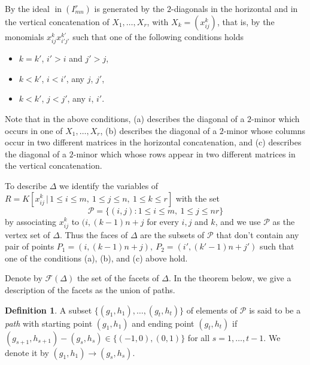 \documentclass[12pt]{amsart}
\numberwithin{equation}{section}
\theoremstyle{definition}
\newtheorem{definition}[theorem]{Definition}
\DeclareMathOperator{\ini}{in}
\begin{document}
\smallskip
By  the ideal $\ini(I_{mn}^r)$ is generated by the $2$-diagonals in the horizontal and in the vertical concatenation of $X_1,\ldots,X_r$, with $X_k=(x_{ij}^k)$, that is, by the monomials $x_{ij}^kx_{i'j'}^{k'}$ such that one of the following conditions holds
\begin{itemize}
    \item[(a)] $k=k'$, $i'>i$ and $j'>j$, 
    \item[(b)] $k<k'$, $i<i'$, any $j$, $j'$,  
    \item[(c)] $k<k'$, $j<j'$, any $i$, $i'$.
\end{itemize}
Note that in the above conditions, (a)
describes the diagonal of a $2$-minor which occurs in one of $X_1, \dots, X_r$, (b) describes the diagonal of a $2$-minor whose columns occur in two different matrices in the horizontal concatenation, and (c) describes the diagonal of a $2$-minor which whose rows appear in two different matrices in the vertical concatenation.

To describe $\Delta$ we identify the variables of $R = K[x_{ij}^k\,|\, 1\le i\le m,\ 1\le j\le n, \ 1 \le k \le r]$ with the set
$$\mathcal{P}=\{(i,j):1\leq i\leq m, \ 1\leq j\leq nr\}$$
by associating  $x_{ij}^k$ to $(i,(k-1)n+j$ for every $i,j$ and $k$, and we use $\mathcal{P}$ as the vertex set of $\Delta.$ Thus the faces of $\Delta$ are the subsets of $\mathcal{P}$ that don't contain any pair of points $P_1=(i,(k-1)n+j),\ P_2=(i',(k'-1)n+j')$ such that one of the conditions (a), (b), and (c) above hold.

Denote by $\mathcal{F}(\Delta)$ the set of the facets of $\Delta$.  In the theorem below, we give a description of the facets as the union of paths. 

\begin{definition}
    A subset $\{(g_1,h_1), \ldots, (g_t, h_t) \}$ of elements of $\mathcal{P}$ is said to be a {\it path} with starting point $(g_1,h_1)$ and ending point $(g_t, h_t)$ if $(g_{s+1}, h_{s+1}) - (g_s, h_s) \in \{(-1,0), (0,1)\}$ for all $s=1,\ldots, t-1$. We denote it by $(g_1,h_1)\longrightarrow (g_s, h_s)$. 
\end{definition} 
\end{document}
